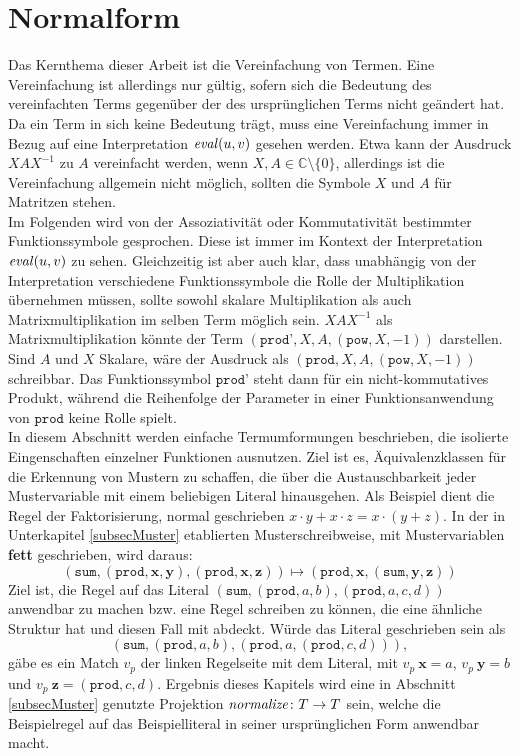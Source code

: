 



\chapter {Normalform} \label{secErsteNormalform}

Das Kernthema dieser Arbeit ist die Vereinfachung von Termen. Eine Vereinfachung ist allerdings nur gültig, sofern sich die Bedeutung des vereinfachten Terms gegenüber der des ursprünglichen Terms nicht geändert hat. Da ein Term in sich keine Bedeutung trägt, muss eine Vereinfachung immer in Bezug auf eine Interpretation $\mathit{eval}(u, v)$ gesehen werden. Etwa kann der Ausdruck $X A X^{-1}$ zu $A$ vereinfacht werden, wenn $X, A \in \mathbb{C} \setminus \{0\}$, allerdings ist die Vereinfachung allgemein nicht möglich, sollten die Symbole $X$ und $A$ für Matritzen stehen. \\
Im Folgenden wird von der Assoziativität oder Kommutativität bestimmter Funktionssymbole gesprochen. Diese ist immer im Kontext der Interpretation $\mathit{eval}(u, v)$ zu sehen. Gleichzeitig ist aber auch klar, dass unabhängig von der Interpretation verschiedene Funktionssymbole die Rolle der Multiplikation übernehmen müssen, sollte sowohl skalare Multiplikation als auch Matrixmultiplikation im selben Term möglich sein. $X A X^{-1}$ als Matrixmultiplikation könnte der Term $(\texttt{prod'}, X, A, (\texttt{pow}, X, -1))$ darstellen. Sind $A$ und $X$ Skalare, wäre der Ausdruck als $(\texttt{prod}, X, A, (\texttt{pow}, X, -1))$ schreibbar. Das Funktionssymbol $\texttt{prod'}$ steht dann für ein nicht-kommutatives Produkt, während die Reihenfolge der Parameter in einer Funktionsanwendung von $\texttt{prod}$ keine Rolle spielt.\\

In diesem Abschnitt werden einfache Termumformungen beschrieben, die isolierte Eingenschaften einzelner Funktionen ausnutzen. Ziel ist es, Äquivalenzklassen für die Erkennung von Mustern zu schaffen, die über die Austauschbarkeit jeder Mustervariable mit einem beliebigen Literal hinausgehen. Als Beispiel dient die Regel der Faktorisierung, normal geschrieben $x \cdot y + x \cdot z = x \cdot (y + z)$. In der in Unterkapitel \ref{subsecMuster} etablierten Musterschreibweise, mit Mustervariablen \textbf{fett} geschrieben, wird daraus:
$$(\texttt{sum}, (\texttt{prod}, \mathbf x, \mathbf y), (\texttt{prod}, \mathbf x, \mathbf z)) \mapsto (\texttt{prod}, \mathbf x, (\texttt{sum}, \mathbf y, \mathbf z))$$
Ziel ist, die Regel auf das Literal $(\texttt{sum}, (\texttt{prod}, a, b), (\texttt{prod}, a, c, d))$ anwendbar zu machen bzw. eine Regel schreiben zu können, die eine ähnliche Struktur hat und diesen Fall mit abdeckt. 
Würde das Literal geschrieben sein als $$(\texttt{sum}, (\texttt{prod}, a, b), (\texttt{prod}, a, (\texttt{prod}, c, d))),$$ gäbe es ein Match $v_p$ der linken Regelseite mit dem Literal, mit $v_p~\mathbf x = a$, $v_p~\mathbf y = b$ und $v_p~\mathbf z = (\texttt{prod}, c, d)$. Ergebnis dieses Kapitels wird eine in Abschnitt \ref{subsecMuster} genutzte Projektion ${\mathit{normalize} \colon T \rightarrow T}$ sein, welche die Beispielregel auf das Beispielliteral in seiner ursprünglichen Form anwendbar macht.\\

